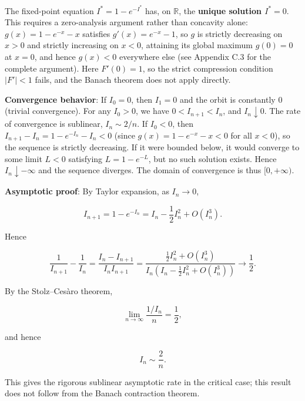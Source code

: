 \documentclass[11pt,a4paper]{amsart}
\begin{document}
The fixed-point equation $I^* = 1 - e^{-I^*}$ has, on $\mathbb{R}$, the \textbf{unique solution $I^* = 0$}. This requires a zero-analysis argument rather than concavity alone: $g(x) = 1 - e^{-x} - x$ satisfies $g'(x) = e^{-x} - 1$, so $g$ is strictly decreasing on $x > 0$ and strictly increasing on $x < 0$, attaining its global maximum $g(0) = 0$ at $x = 0$, and hence $g(x) < 0$ everywhere else (see Appendix C.3 for the complete argument). Here $F'(0) = 1$, so the strict compression condition $|F'| < 1$ fails, and the Banach theorem does not apply directly.

\textbf{Convergence behavior}: If $I_0 = 0$, then $I_1 = 0$ and the orbit is constantly $0$ (trivial convergence). For any $I_0 > 0$, we have $0 < I_{n+1} < I_n$, and $I_n \downarrow 0$. The rate of convergence is sublinear, $I_n \sim 2/n$. If $I_0 < 0$, then $I_{n+1} - I_n = 1 - e^{-I_n} - I_n < 0$ (since $g(x) = 1 - e^{-x} - x < 0$ for all $x < 0$), so the sequence is strictly decreasing. If it were bounded below, it would converge to some limit $L < 0$ satisfying $L = 1 - e^{-L}$, but no such solution exists. Hence $I_n \downarrow -\infty$ and the sequence diverges. The domain of convergence is thus $[0, +\infty)$.

\textbf{Asymptotic proof}: By Taylor expansion, as $I_n \to 0$,

\begin{equation}
\label{eq:taylor}
I_{n+1} = 1 - e^{-I_n} = I_n - \frac{1}{2}I_n^2 + O(I_n^3).
\end{equation}

Hence

\begin{equation}
\label{eq:stolz-step}
\frac{1}{I_{n+1}} - \frac{1}{I_n} = \frac{I_n - I_{n+1}}{I_n I_{n+1}} = \frac{\frac{1}{2}I_n^2 + O(I_n^3)}{I_n\left(I_n - \frac{1}{2}I_n^2 + O(I_n^3)\right)} \longrightarrow \frac{1}{2}.
\end{equation}

By the Stolz--Ces\`{a}ro theorem,

\begin{equation}
\label{eq:stolz-limit}
\lim_{n\to\infty} \frac{1/I_n}{n} = \frac{1}{2},
\end{equation}

and hence

\begin{equation}
\label{eq:asymptotic}
\boxed{I_n \sim \frac{2}{n}}.
\end{equation}

This gives the rigorous sublinear asymptotic rate in the critical case; this result does not follow from the Banach contraction theorem.
\end{document}
